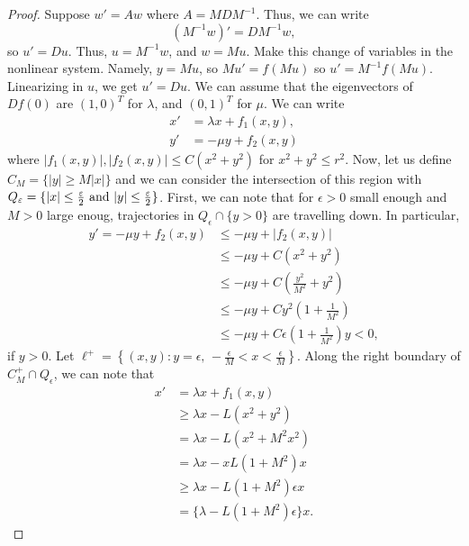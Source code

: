 \documentclass{article}
\begin{document}
    \begin{proof}
        Suppose $w' = Aw$ where $A = MDM^{-1}$. Thus, we can write 
        \[
            (M^{-1} w)' = DM^{-1} w,
        \]
        so $u' = Du$. Thus, $u = M^{-1} w$, and $w = Mu$. Make this change of variables in the nonlinear system. Namely, $y= Mu$, so $Mu' = f(Mu)$ so $u' = M^{-1} f(Mu)$. Linearizing in $u$, we get $u' = Du$. We can assume that the eigenvectors of $Df(0)$ are $(1, 0)^T$ for $\lambda$, and $(0, 1)^T$ for $\mu$. We can write 
        \begin{align*}
            x' &= \lambda x + f_1(x, y), \\
            y' &= -\mu y + f_2(x, y)
        \end{align*}
        where $|f_1(x, y)|, |f_2(x, y)| \leq C(x^2 + y^2)$ for $x^2 + y^2 \leq r^2$. Now, let us define $C_M = \{|y| \geq M|x|\}$ and we can consider the intersection of this region with $Q_\varepsilon = \{|x| \leq \frac{\varepsilon}{2} \text{ and } |y| \leq \frac{\varepsilon}{2}\}$. First, we can note that for $\epsilon > 0$ small enough and $M> 0$ large enoug, trajectories in $Q_\epsilon \cap \{y > 0\}$ are travelling down. In particular, 
        \begin{align*}
            y' = -\mu y + f_2(x, y) &\leq -\mu y + |f_2(x, y)| \\
            &\leq -\mu y + C(x^2 + y^2) \\
            &\leq -\mu y + C\left(\frac{y^2}{M^2} + y^2 \right) \\
            &\leq -\mu y + Cy^2 \left(1 + \frac{1}{M^2} \right) \\
            &\leq -\mu y + C\epsilon\left(1 + \frac{1}{M^2} \right) y < 0,
        \end{align*}
        if $y > 0$. Let $\ell^+ = \left\{(x, y) : y = \epsilon, \, -\frac{\epsilon}{M} < x < \frac{\epsilon}{M}\right\}$. Along the right boundary of $C_M^+ \cap Q_\epsilon$, we can note that 
        \begin{align*}
            x' &= \lambda x + f_1(x, y) \\
            &\geq \lambda x - L(x^2 + y^2) \\
            &= \lambda x - L(x^2 + M^2 x^2) \\
            &= \lambda x - xL(1 + M^2) x \\
            &\geq \lambda x - L(1 + M^2) \epsilon x \\
            &= \{\lambda - L(1 + M^2)\epsilon \}x.
        \end{align*}

\end{proof}
\end{document}
